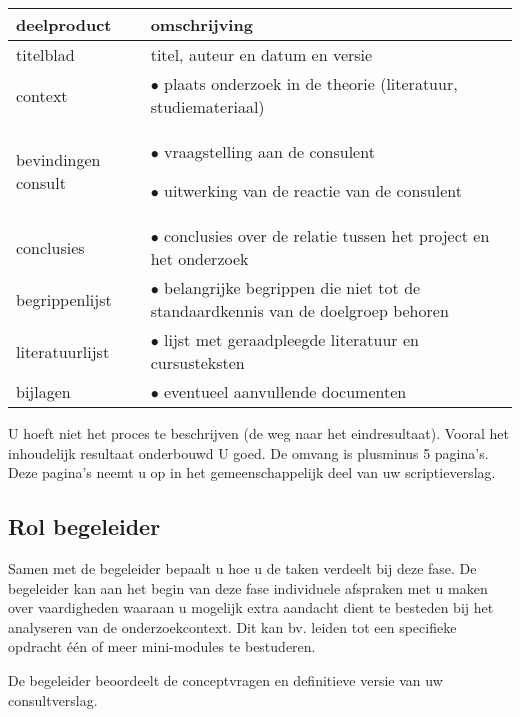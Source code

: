 \begin{center}
\begin{tabular}{|l|p{30em}|}
\hline
{\bf deelproduct} & {\bf omschrijving}
\\\hline
titelblad & titel, auteur en datum en versie
\\\hline
context &
    \par $\bullet$ plaats onderzoek in de theorie (literatuur, studiemateriaal)
\\\hline
bevindingen consult &
    \par $\bullet$ vraagstelling aan de consulent
    \par $\bullet$ uitwerking van de reactie van de consulent
\\\hline
conclusies &
    \par $\bullet$ conclusies over de relatie tussen het project en het onderzoek
\\\hline
begrippenlijst &
    \par $\bullet$ belangrijke begrippen die niet tot de standaardkennis van de doelgroep
		    behoren
\\\hline
literatuurlijst &
    \par $\bullet$ lijst met geraadpleegde literatuur en cursusteksten
\\\hline
bijlagen &
    \par $\bullet$ eventueel aanvullende documenten
\\\hline
\end{tabular}
\end{center}

U hoeft niet het proces te beschrijven (de weg naar het eindresultaat).
Vooral het inhoudelijk resultaat onderbouwd U goed. De omvang is plusminus  5 pagina's.
Deze pagina's neemt u op in het gemeenschappelijk deel van uw scriptieverslag.

\subsection{Rol begeleider}
Samen met de begeleider bepaalt u hoe u de taken verdeelt bij deze fase.
De begeleider kan aan het begin van deze fase individuele afspraken met u
maken over vaardigheden waaraan u mogelijk extra aandacht dient te besteden bij
het analyseren van de onderzoekcontext. Dit kan bv. leiden tot een specifieke
opdracht één of meer mini-modules te bestuderen.

De begeleider beoordeelt de conceptvragen en definitieve versie van uw
consultverslag.

